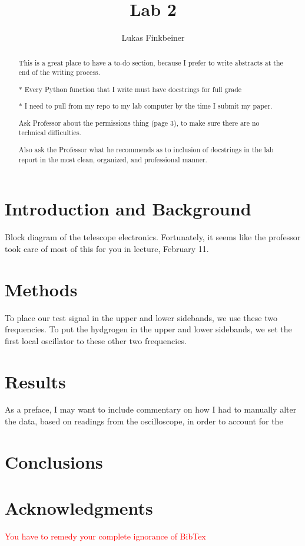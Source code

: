 \documentclass[a4paper]{article}
\title{Lab 2}
\author{Lukas Finkbeiner}
\begin{document}
\maketitle

\begin{abstract}

This is a great place to have a to-do section, because I prefer to write abstracts at the end of the writing process.

* Every Python function that I write must have docstrings for full grade

* I need to pull from my repo to my lab computer by the time I submit my paper.

\quad * Ask Professor about the permissions thing (page 3), to make sure there are no technical difficulties.

\quad * Also ask the Professor what he recommends as to inclusion of docstrings in the lab report in the most clean, organized, and professional manner.

\end{abstract}


\section{Introduction and Background}

Block diagram of the telescope electronics. Fortunately, it seems like the professor took care of most of this for you in lecture, February 11.

\section{Methods}

To place our test signal in the upper and lower sidebands, we use these two frequencies. To put the hydgrogen in the upper and lower sidebands, we set the first local oscillator to these other two frequencies.

\section{Results}

As a preface, I may want to include commentary on how I had to manually alter the data, based on readings from the oscilloscope, in order to account for the 

\section{Conclusions}

\section{Acknowledgments}

\textcolor{red}{You have to remedy your complete ignorance of BibTex}
\end{document}
